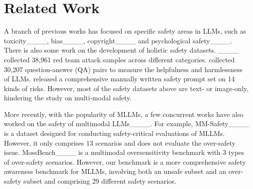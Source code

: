 \section{Related Work}
A branch of previous works has focused on specific safety areas in LLMs, such as toxicity____, bias____, copyright____ and psychological safety____. There is also some work on the development of holistic safety datasets. ____ collected 38,961 red team attack samples across different categories.  collected 30,207 question-answer (QA) pairs to measure the helpfulness and harmlessness of LLMs.  released a comprehensive manually written safety prompt set on 14 kinds of risks. 
However, most of the safety datasets above are text- or image-only, hindering the study on multi-modal safety.


More recently, with the popularity of MLLMs, a few concurrent works have also worked on the safety of multimodal LLMs____. For example, MM-Safety____ is a dataset designed for conducting safety-critical evaluations of MLLMs. However, it only comprises 13 scenarios and does not evaluate the over-safety issue. MossBench____ is a multimodal oversensitivity benchmark with 3 types of over-safety scenarios. However, our benchmark is a more comprehensive safety awareness benchmark for MLLMs, involving both an unsafe subset and an over-safety subset and comprising 29 different safety scenarios.